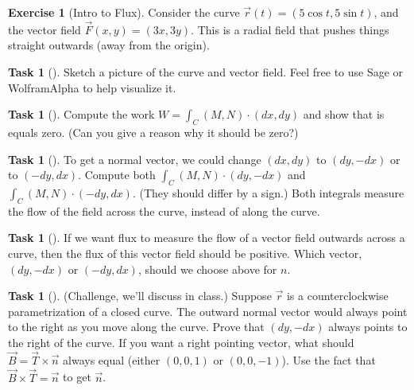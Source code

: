 \documentclass[10pt,]{book}
\theoremstyle{plain}
\theoremstyle{definition}
\theoremstyle{definition}
\theoremstyle{definition}
\theoremstyle{definition}
\newtheorem{exploration}[project]{Exercise}
\newtheorem{task}[project]{Task}
\theoremstyle{definition}
\numberwithin{equation}{section}
\newcommand{\ds}{\displaystyle}
\begin{document}
\begin{exploration}[Intro to Flux]\label{exploration-195}
Consider the curve \(\vec r(t) = (5\cos t, 5\sin t)\), and the vector field \(\vec F(x,y) = (3x, 3y)\). This is a radial field that pushes things straight outwards (away from the origin).%
\begin{task}[]\label{task-489}
Sketch a picture of the curve and vector field. Feel free to use Sage or WolframAlpha to help visualize it.%
\end{task}
\begin{task}[]\label{task-490}
Compute the work \(\ds W= \int_C (M,N)\cdot (dx,dy)\) and show that is equals zero. (Can you give a reason why it should be zero?)  %
\end{task}
\begin{task}[]\label{task-491}
To get a normal vector, we could change \((dx,dy)\) to \((dy,-dx)\) or to \((-dy,dx)\). Compute both \(\ds \int_C (M,N)\cdot (dy,-dx)\) and \(\ds \int_C (M,N)\cdot (-dy,dx)\). (They should differ by a sign.) Both integrals measure the flow of the field across the curve, instead of along the curve.%
\end{task}
\begin{task}[]\label{task-492}
If we want flux to measure the flow of a vector field outwards across a curve, then the flux of this vector field should be positive.  Which vector, \((dy,-dx)\) or \((-dy,dx)\),  should we choose above for \(n\).  %
\end{task}
\begin{task}[]\label{task-493}
(Challenge, we'll discuss in class.) Suppose \(\vec r\) is a counterclockwise parametrization of a closed curve.  The outward normal vector would always point to the right as you move along the curve.  Prove that \((dy,-dx)\) always points to the right of the curve. If you want a right pointing vector, what should \(\vec B=\vec T\times \vec n\) always equal (either \((0,0,1)\) or \((0,0,-1)\)). Use the fact that \(\vec B\times \vec T = \vec n\) to get \(\vec n\).%
%
\end{task}
\end{exploration}
\end{document}
